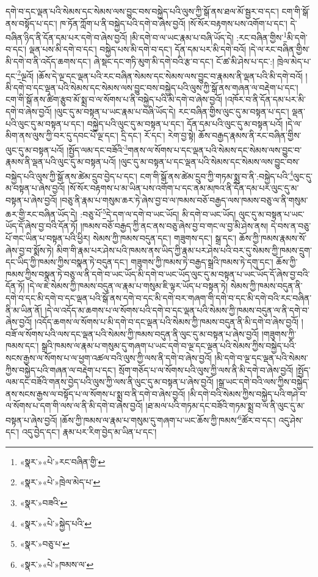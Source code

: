 དགེ་བ་དང་ལྡན་པའི་སེམས་དང་སེམས་ལས་བྱུང་བས་བསྐྱེད་པའི་ལུས་ཀྱི་སྒོ་ནས་ཐལ་མོ་སྦྱར་བ་དང་། ངག་གི་སྒོ་ནས་བསྟོད་པ་དང་། ཁ་ཏོན་ཀློག་པ་ནི་བསྐྱེད་པའི་དགེ་བ་ཞེས་བྱའོ། །སོ་སོར་བརྟགས་པས་འགོག་པ་དང་། དེ་བཞིན་ཉིད་ནི་དོན་དམ་པར་དགེ་བ་ཞེས་བྱའོ། །མི་དགེ་བ་ལ་ཡང་རྣམ་པ་བཞི་ཡོད་དེ། :རང་བཞིན་གྱིས་\footnote{«སྣར་»«པེ་»རང་བཞིན་གྱི་}མི་དགེ་བ་དང་། ལྡན་པས་མི་དགེ་བ་དང་། བསྐྱེད་པས་མི་དགེ་བ་དང་། དོན་དམ་པར་མི་དགེ་བའོ། །དེ་ལ་རང་བཞིན་གྱིས་མི་དགེ་བ་ནི་འདོད་ཆགས་དང་། ཞེ་སྡང་དང་གཏི་མུག་མི་དགེ་བའི་རྩ་བ་དང་། ངོ་ཚ་མི་ཤེས་པ་དང་:། ཁྲེལ་མེད་པ་དང་\footnote{«སྣར་»«པེ་»ཁྲེལ་མེད་པ་}ལྔའོ། །ཆོས་དེ་ལྔ་དང་ལྡན་པའི་རང་བཞིན་སེམས་དང་སེམས་ལས་བྱུང་བ་རྣམས་ནི་ལྡན་པའི་མི་དགེ་བའོ། །མི་དགེ་བ་དང་ལྡན་པའི་སེམས་དང་སེམས་ལས་བྱུང་བས་བསྐྱེད་པའི་ལུས་ཀྱི་སྒོ་ནས་གཞན་ལ་བརྡེག་པ་དང་། ངག་གི་སྒོ་ནས་ཚིག་རྩུབ་མོ་སྨྲ་བ་ལ་སོགས་པ་ནི་བསྐྱེད་པའི་མི་དགེ་བ་ཞེས་བྱའོ། །འཁོར་བ་ནི་དོན་དམ་པར་མི་དགེ་བ་ཞེས་བྱའོ། །ལུང་དུ་མ་བསྟན་པ་ཡང་རྣམ་པ་བཞི་ཡོད་དེ། རང་བཞིན་གྱིས་ལུང་དུ་མ་བསྟན་པ་དང་། ལྡན་པའི་ལུང་དུ་མ་བསྟན་པ་དང་། བསྐྱེད་པའི་ལུང་དུ་མ་བསྟན་པ་དང་། དོན་དམ་པའི་ལུང་དུ་མ་བསྟན་པའོ། །དེ་ལ་མིག་ནས་ལུས་ཀྱི་བར་དུ་དབང་པོ་ལྔ་དང་། དྲི་དང་། རོ་དང་། རེག་བྱ་སྟེ། ཆོས་བརྒྱད་རྣམས་ནི་རང་བཞིན་གྱིས་ལུང་དུ་མ་བསྟན་པའོ། །སྤྱོད་ལམ་དང་བཟོའི་\footnote{«སྣར་»བཟའི་}གནས་ལ་སོགས་པ་དང་ལྡན་པའི་སེམས་དང་སེམས་ལས་བྱུང་བ་རྣམས་ནི་ལྡན་པའི་ལུང་དུ་མ་བསྟན་པའོ། །ལུང་དུ་མ་བསྟན་པ་དང་ལྡན་པའི་སེམས་དང་སེམས་ལས་བྱུང་བས་བསྐྱེད་པའི་ལུས་ཀྱི་སྒོ་ནས་ཚེམ་དྲུབ་བྱེད་པ་དང་། ངག་གི་སྒོ་ནས་ཚེམ་དྲུབ་ཀྱི་གཏམ་སྨྲ་བ་ནི་:བསྐྱེད་པའི་\footnote{«སྣར་»«པེ་»སྐྱེད་པའི་}ལུང་དུ་མ་བསྟན་པ་ཞེས་བྱའོ། །སོ་སོར་བརྟགས་པ་མ་ཡིན་པས་འགོག་པ་དང་ནམ་མཁའ་ནི་དོན་དམ་པར་ལུང་དུ་མ་བསྟན་པ་ཞེས་བྱའོ། །བཅུ་ནི་རྣམ་པ་གསུམ་ཆར་ཏེ་ཞེས་བྱ་བ་ལ་ཁམས་བཅོ་བརྒྱད་ལས་ཁམས་བཅུ་ལ་ནི་གསུམ་ཆར་གྱི་རང་བཞིན་ཡོད་དེ། :བཅུ་པོ་\footnote{«སྣར་»བཅུ་པ་}དེ་དག་ལ་དགེ་བ་ཡང་ཡོད། མི་དགེ་བ་ཡང་ཡོད། ལུང་དུ་མ་བསྟན་པ་ཡང་ཡོད་དོ་ཞེས་བྱ་བའི་དོན་ཏོ། །ཁམས་བཅོ་བརྒྱད་ཀྱི་ནང་ནས་བཅུ་ཞེས་བྱ་བ་གང་ལ་བྱ་མི་ཤེས་ནས། དེ་བས་ན་བཅུ་པོ་གང་ཡིན་པ་བསྟན་པའི་ཕྱིར། སེམས་ཀྱི་ཁམས་བདུན་དང་། གཟུགས་དང་། སྒྲ་དང་། ཆོས་ཀྱི་ཁམས་རྣམས་སོ་ཞེས་བྱ་བ་སྨོས་ཏེ། མིག་གི་རྣམ་པར་ཤེས་པའི་ཁམས་ནས་ཡིད་ཀྱི་རྣམ་པར་ཤེས་པའི་བར་དུ་སེམས་ཀྱི་ཁམས་དྲུག་དང་ཡིད་ཀྱི་ཁམས་ཀྱིས་བསྣན་ཏེ་བདུན་དང་། གཟུགས་ཀྱི་ཁམས་ཏེ་བརྒྱད་སྒྲའི་ཁམས་ཏེ་དགུ་དང་། ཆོས་ཀྱི་ཁམས་ཀྱིས་བསྣན་ཏེ་བཅུ་ལ་ནི་དགེ་བ་ཡང་ཡོད་མི་དགེ་བ་ཡང་ཡོད་ལུང་དུ་མ་བསྟན་པ་ཡང་ཡོད་དོ་ཞེས་བྱ་བའི་དོན་ཏོ། །དེ་ལ་ཇེ་སེམས་ཀྱི་ཁམས་བདུན་ལ་རྣམ་པ་གསུམ་ཇི་ལྟར་ཡོད་པ་བསྟན་ཏེ། སེམས་ཀྱི་ཁམས་བདུན་ནི་དགེ་བ་དང་མི་དགེ་བ་དང་ལྡན་པའི་སྒོ་ནས་དགེ་བ་དང་མི་དགེ་བར་གཞག་གི་དགེ་བ་དང་མི་དགེ་བའི་རང་བཞིན་ནི་མ་ཡིན་ནོ། །དེ་ལ་འདོད་མ་ཆགས་པ་ལ་སོགས་པའི་དགེ་བ་དང་ལྡན་པའི་སེམས་ཀྱི་ཁམས་བདུན་ལ་ནི་དགེ་བ་ཞེས་བྱའོ། །འདོད་ཆགས་ལ་སོགས་པ་མི་དགེ་བ་དང་ལྡན་པའི་སེམས་ཀྱི་ཁམས་བདུན་ནི་མི་དགེ་བ་ཞེས་བྱའོ། །བཟོ་ལ་སོགས་པའི་ལས་དང་ལྡན་པའི་སེམས་ཀྱི་ཁམས་བདུན་ནི་ལུང་དུ་མ་བསྟན་པ་ཞེས་བྱའོ། །གཟུགས་ཀྱི་ཁམས་དང་། སྒྲའི་ཁམས་ལ་རྣམ་པ་གསུམ་དུ་གཞག་པ་ཡང་དགེ་བ་ལྔ་དང་ལྡན་པའི་སེམས་ཀྱིས་བསྐྱེད་པའི་སངས་རྒྱས་ལ་སོགས་པ་ལ་ཕྱག་འཚལ་བའི་ལུས་ཀྱི་ལས་ནི་དགེ་བ་ཞེས་བྱའོ། །མི་དགེ་བ་ལྔ་དང་ལྡན་པའི་སེམས་ཀྱིས་བསྐྱེད་པའི་གཞན་ལ་བརྡེག་པ་དང་། སྲོག་གཅོད་པ་ལ་སོགས་པའི་ལུས་ཀྱི་ལས་ནི་མི་དགེ་བ་ཞེས་བྱའོ། །སྤྱོད་ལམ་དང་བཟོའི་གནས་བྱེད་པའི་ལུས་ཀྱི་ལས་ནི་ལུང་དུ་མ་བསྟན་པ་ཞེས་བྱའོ། །སྒྲ་ཡང་དགེ་བའི་ལས་ཀྱིས་བསྐྱེད་ནས་སངས་རྒྱས་ལ་བསྟོད་པ་ལ་སོགས་པ་སྨྲ་བ་ནི་དགེ་བ་ཞེས་བྱའོ། །མི་དགེ་བའི་སེམས་ཀྱིས་བསྐྱེད་པའི་གཤེ་བ་ལ་སོགས་པ་དག་གི་ལས་ལ་ནི་མི་དགེ་བ་ཞེས་བྱའོ། །ཐ་མལ་པའི་གཏམ་དང་བཟོའི་གཏམ་སྨྲ་བ་ལ་ནི་ལུང་དུ་མ་བསྟན་པ་ཞེས་བྱའོ། །ཆོས་ཀྱི་ཁམས་ལ་རྣམ་པ་གསུམ་དུ་གཞག་པ་ཡང་ཆོས་ཀྱི་ཁམས་\footnote{«སྣར་»«པེ་»ཁམས་ལ་}ཚོར་བ་དང་། འདུ་ཤེས་དང་། འདུ་བྱེད་དང་། རྣམ་པར་རིག་བྱེད་མ་ཡིན་པ་དང་། 